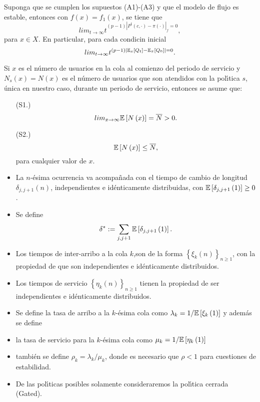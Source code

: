 \begin{Teo}\label{Tma.6.3}
Suponga que se cumplen los supuestos (A1)-(A3) y que el modelo de
flujo es estable, entonces con
$f\left(x\right)=f_{1}\left(x\right)$, se tiene que
\[lim_{t\rightarrow\infty}t^{(p-1)\left|P^{t}\left(c,\cdot\right)-\pi\left(\cdot\right)\right|_{f}=0},\]
para $x\in X$. En particular, para cada condicin inicial
\[lim_{t\rightarrow\infty}t^{(p-1)\left|\mathbb{E}_{x}\left[Q_{t}\right]-\mathbb{E}_{\pi}\left[Q_{0}\right]\right|=0}.\]
\end{Teo}



Si $x$ es el n{\'u}mero de usuarios en la cola al comienzo del
periodo de servicio y $N_{s}\left(x\right)=N\left(x\right)$ es el
n{\'u}mero de usuarios que son atendidos con la pol{\'\i}tica $s$,
{\'u}nica en nuestro caso, durante un periodo de servicio,
entonces se asume que:
\begin{itemize}
\item[(S1.)]
\begin{equation}\label{S1}
lim_{x\rightarrow\infty}\mathbb{E}\left[N\left(x\right)\right]=\overline{N}>0.
\end{equation}
\item[(S2.)]
\begin{equation}\label{S2}
\mathbb{E}\left[N\left(x\right)\right]\leq \overline{N}, \end{equation}
para cualquier valor de $x$. \item La $n$-{\'e}sima ocurrencia va
acompa{\~n}ada con el tiempo de cambio de longitud
$\delta_{j,j+1}\left(n\right)$, independientes e id{\'e}nticamente
distribuidas, con
$\mathbb{E}\left[\delta_{j,j+1}\left(1\right)\right]\geq0$. \item Se
define
\begin{equation}
\delta^{*}:=\sum_{j,j+1}\mathbb{E}\left[\delta_{j,j+1}\left(1\right)\right].
\end{equation}

\item Los tiempos de inter-arribo a la cola $k$,son de la forma
$\left\{\xi_{k}\left(n\right)\right\}_{n\geq1}$, con la propiedad
de que son independientes e id{\'e}nticamente distribuidos.

\item Los tiempos de servicio
$\left\{\eta_{k}\left(n\right)\right\}_{n\geq1}$ tienen la
propiedad de ser independientes e id{\'e}nticamente distribuidos.

\item Se define la tasa de arribo a la $k$-{\'e}sima cola como
$\lambda_{k}=1/\mathbb{E}\left[\xi_{k}\left(1\right)\right]$ y
adem{\'a}s se define

\item la tasa de servicio para la $k$-{\'e}sima cola como
$\mu_{k}=1/\mathbb{E}\left[\eta_{k}\left(1\right)\right]$

\item tambi{\'e}n se define $\rho_{k}=\lambda_{k}/\mu_{k}$, donde
es necesario que $\rho<1$ para cuestiones de estabilidad.

\item De las pol{\'\i}ticas posibles solamente consideraremos la
pol{\'\i}tica cerrada (Gated).
\end{itemize}

